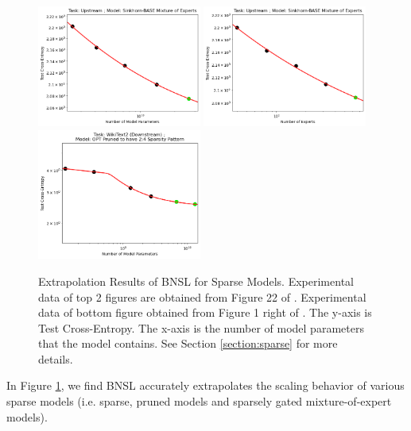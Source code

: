 \documentclass{article} %
\begin{document}
\vspace{-3.5mm}

\begin{figure}[htbp]
    \centering
\includegraphics[width=0.48\textwidth]{figures/sparse/moe_sbase__params.png}
\includegraphics[width=0.48\textwidth]{figures/sparse/moe_sbase__experts.png}
\includegraphics[width=0.48\textwidth]{figures/sparse/sparsity_via_pruning.png}
\vspace{-3.5mm}
    \caption{
Extrapolation Results of BNSL for Sparse Models. Experimental data of top 2 figures are obtained from Figure 22 of \cite{clark2022unified}. Experimental data of bottom figure obtained from Figure 1 right of \cite{frantar2023massive}. The y-axis is Test Cross-Entropy. The x-axis is the number of model parameters that the model contains. See Section \ref{section:sparse} for more details.
    }
    \label{fig:sparse}
\end{figure}

In Figure \ref{fig:sparse}, we find BNSL accurately extrapolates the scaling behavior of various sparse models (i.e. sparse, pruned models and sparsely gated mixture-of-expert models).
\end{document}
